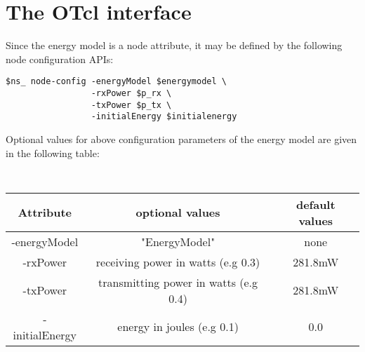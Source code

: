 \section{The OTcl interface}
\label{sec:otclenergymodel}

Since the energy model is a node attribute, it may be defined by the
following node configuration APIs:
\begin{verbatim}
$ns_ node-config -energyModel $energymodel \
                 -rxPower $p_rx \
                 -txPower $p_tx \
                 -initialEnergy $initialenergy
\end{verbatim}
Optional values for above configuration parameters of the energy
model are given in the following table:
\begin{table}[h]
\begin{center}
{\tt
\begin{tabular}{|c||c|c|}\hline
{\bf Attribute} & {\bf optional values} & {\bf default values}\\\hline
\rm -energyModel& \rm "EnergyModel"&  \rm none\\\hline
\rm -rxPower& \rm receiving power in watts (e.g 0.3)& \rm 281.8mW\\\hline
\rm -txPower& \rm transmitting power in watts (e.g 0.4)& \rm 
281.8mW\\\hline
\rm -initialEnergy& \rm energy in joules (e.g 0.1)& \rm 0.0\\\hline
\end{tabular}
}
\end{center}
\end{table}
\clearpage

